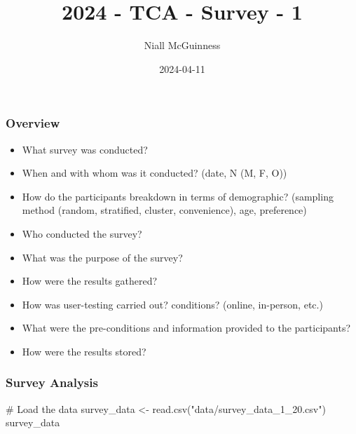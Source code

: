 \documentclass[
  letterpaper,
  DIV=11,
  numbers=noendperiod]{scrartcl}
\title{2024 - TCA - Survey - 1}
\author{Niall McGuinness}
\date{2024-04-11}
\newenvironment{Shaded}{\begin{snugshade}}{\end{snugshade}}
\newcommand{\CommentTok}[1]{\textcolor[rgb]{0.37,0.37,0.37}{#1}}
\newcommand{\FunctionTok}[1]{\textcolor[rgb]{0.28,0.35,0.67}{#1}}
\newcommand{\NormalTok}[1]{\textcolor[rgb]{0.00,0.23,0.31}{#1}}
\newcommand{\OtherTok}[1]{\textcolor[rgb]{0.00,0.23,0.31}{#1}}
\newcommand{\StringTok}[1]{\textcolor[rgb]{0.13,0.47,0.30}{#1}}
\providecommand{\tightlist}{%
  \setlength{\itemsep}{0pt}\setlength{\parskip}{0pt}}\usepackage{longtable,booktabs,array}
\begin{document}
\maketitle

\subsubsection{Overview}\label{overview}

\begin{itemize}
\tightlist
\item
  What survey was conducted?
\item
  When and with whom was it conducted? (date, N (M, F, O))
\item
  How do the participants breakdown in terms of demographic? (sampling
  method (random, stratified, cluster, convenience), age, preference)
\item
  Who conducted the survey?
\item
  What was the purpose of the survey?
\item
  How were the results gathered?
\item
  How was user-testing carried out? conditions? (online, in-person,
  etc.)
\item
  What were the pre-conditions and information provided to the
  participants?
\item
  How were the results stored?
\end{itemize}

\subsubsection{Survey Analysis}\label{survey-analysis}

\begin{Shaded}
\begin{Highlighting}[]
\CommentTok{\# Load the data}
\NormalTok{survey\_data }\OtherTok{\textless{}{-}} \FunctionTok{read.csv}\NormalTok{(}\StringTok{"data/survey\_data\_1\_20.csv"}\NormalTok{)}
\NormalTok{survey\_data}
\end{Highlighting}
\end{Shaded}
\end{document}
